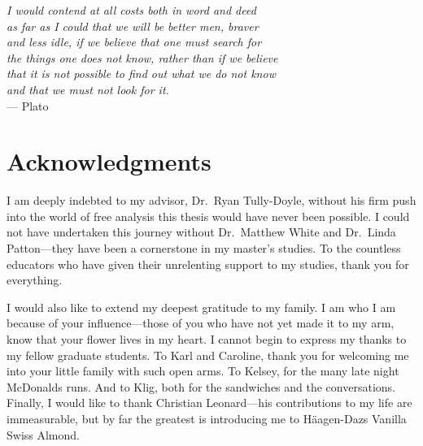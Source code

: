 
\begin{flushright}{\slshape
    I would contend at all costs both in word and deed\\
    as far as I could that we will be better men, braver\\
    and less idle, if we believe that one must search for \\
    the things one does not know, rather than if we believe \\
    that it is not possible to find out what we do not know \\
    and that we must not look for it.} \\ \medskip
    --- Plato
\end{flushright}



\bigskip

\begingroup
\let\clearpage\relax
\let\cleardoublepage\relax
\let\cleardoublepage\relax
\chapter*{Acknowledgments}

I am deeply indebted to my advisor, Dr.\ Ryan Tully-Doyle, without his firm
push into the world of free analysis this thesis would have never been possible.
I could not have undertaken this journey without Dr.\ Matthew White and Dr.\
Linda Patton---they have been a cornerstone in my master's studies. To the
countless educators who have given their unrelenting support to my studies,
thank you for everything.

\bigskip
I would also like to extend my deepest gratitude to my family. I am who I am
because of your influence---those of you who
have not yet made it to my arm, know that your flower lives in my heart.
I cannot begin to express my thanks to my fellow graduate students. To Karl and
Caroline, thank you for welcoming me into your little family with such open
arms. To Kelsey, for the many late night McDonalds runs. And to Klig, both for
the sandwiches and the conversations.
Finally, I would like to thank Christian Leonard---his contributions to my life
are immeasurable, but by far the greatest is introducing me to H\"aagen-Dazs
Vanilla Swiss Almond.

\endgroup
